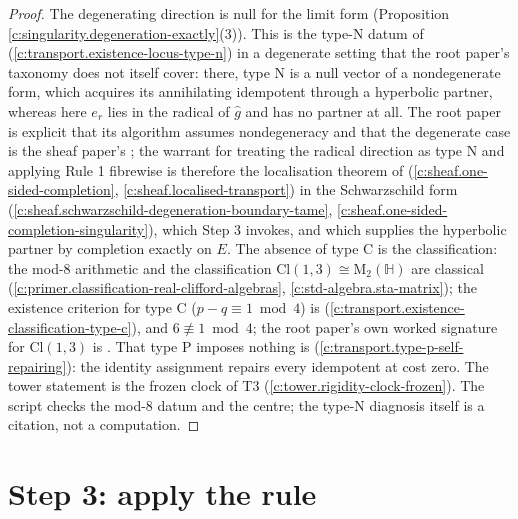 \documentclass[11pt]{article}
\theoremstyle{definition}
\theoremstyle{plain}
\providecommand{\Cl}{}\renewcommand{\Cl}{\mathrm{Cl}}
\providecommand{\HH}{}\renewcommand{\HH}{\mathbb{H}}
\providecommand{\Mat}{}\renewcommand{\Mat}{\mathrm{M}}
\providecommand{\er}{}\renewcommand{\er}{e_r}
\begin{document}
\begin{proof}
The degenerating direction is null for the limit form (Proposition \ref{c:singularity.degeneration-exactly}(3)). This is the type-N datum of \cite[Def.~3.1, Prop.~3.3]{ButlerT1} (\ref{c:transport.existence-locus-type-n}) in a degenerate setting that the root paper's taxonomy does not itself cover: there, type N is a null vector of a nondegenerate form, which acquires its annihilating idempotent through a hyperbolic partner, whereas here $\er$ lies in the radical of $\hat g$ and has no partner at all. The root paper is explicit that its algorithm assumes nondegeneracy and that the degenerate case is the sheaf paper's \cite[Rem.~4.15, Rem.~8.4]{ButlerT1}; the warrant for treating the radical direction as type N and applying Rule 1 fibrewise is therefore the localisation theorem of \cite[Thm.~4.4, Cor.~4.5]{ButlerT4} (\ref{c:sheaf.one-sided-completion}, \ref{c:sheaf.localised-transport}) in the Schwarzschild form \cite[Thms 8.7, 8.12]{ButlerT4} (\ref{c:sheaf.schwarzschild-degeneration-boundary-tame}, \ref{c:sheaf.one-sided-completion-singularity}), which Step 3 invokes, and which supplies the hyperbolic partner by completion exactly on $E$. The absence of type C is the classification: the mod-8 arithmetic and the classification $\Cl(1,3) \cong \Mat_2(\HH)$ are classical \cite{Porteous1995} (\ref{c:primer.classification-real-clifford-algebras}, \ref{c:std-algebra.sta-matrix}); the existence criterion for type C ($p - q \equiv 1 \bmod 4$) is \cite[Thm.~3.6]{ButlerT1} (\ref{c:transport.existence-classification-type-c}), and $6 \not\equiv 1 \bmod 4$; the root paper's own worked signature for $\Cl(1,3)$ is \cite[Ex.~3.12]{ButlerT1}. That type P imposes nothing is \cite[Prop.~6.1]{ButlerT1} (\ref{c:transport.type-p-self-repairing}): the identity assignment repairs every idempotent at cost zero. The tower statement is the frozen clock of T3 \cite{ButlerT3} (\ref{c:tower.rigidity-clock-frozen}). The script checks the mod-8 datum and the centre; the type-N diagnosis itself is a citation, not a computation.

\end{proof}

\section{Step 3: apply the rule}
\end{document}
